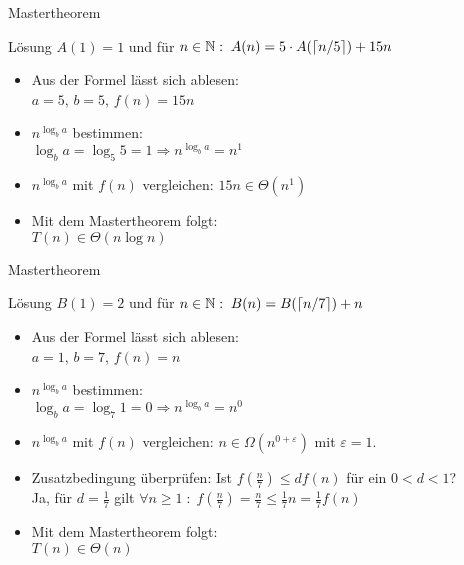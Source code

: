 \begin{frame}{Mastertheorem}
    
    \begin{block}{Lösung}
        $A(1)=1$ und für $n \in \mathbb{N} : \; A(n) = 5 \cdot A(\lceil n / 5 \rceil) + 15n$
        \begin{itemize}
            \item Aus der Formel lässt sich ablesen:\\
                $a=5$, $b=5$, $f(n)=15n$
            \item $n^{\log_b a}$ bestimmen:\\
                $\log_b a = \log_5 5 = 1 \Rightarrow n^{\log_b a} = n^1$
            \item $n^{\log_b a}$ mit $f(n)$ vergleichen: $15n \in \Theta(n^{1})$
            \item Mit dem Mastertheorem folgt:\\
                $T(n) \in \Theta(n \log n)$
        \end{itemize}
    \end{block}

\end{frame}

\begin{frame}{Mastertheorem}
    
    \begin{block}{Lösung}
        $B(1)=2$ und für $n \in \mathbb{N} : \; B(n) = B(\lceil n / 7 \rceil) + n$
        \begin{itemize}
            \item Aus der Formel lässt sich ablesen:\\
                $a=1$, $b=7$, $f(n)=n$
            \item $n^{\log_b a}$ bestimmen:\\
                $\log_b a = \log_7 1 = 0 \Rightarrow n^{\log_b a} = n^0$
            \item $n^{\log_b a}$ mit $f(n)$ vergleichen: $n \in \Omega(n^{0+\varepsilon})$ mit $\varepsilon = 1$.
            \item Zusatzbedingung überprüfen: Ist $f\left(\frac{n}{7}\right)\leq d f(n)$ für ein $0< d < 1$?\\
                Ja, für $d = \frac{1}{7}$ gilt $\forall n \geq 1 \; : \; f\left(\frac{n}{7}\right)=\frac{n}{7} \leq \frac{1}{7}n = \frac{1}{7}f(n)$
            \item Mit dem Mastertheorem folgt:\\
                $T(n) \in \Theta(n)$
        \end{itemize}
    \end{block}

\end{frame}

